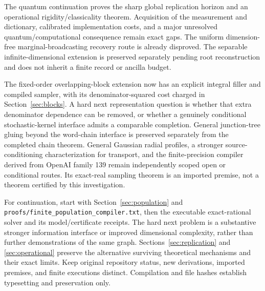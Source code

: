 \documentclass[11pt]{article}
\begin{document}
The quantum continuation proves the sharp global replication horizon and an operational rigidity/classicality theorem. Acquisition of the measurement and dictionary, calibrated implementation costs, and a major unresolved quantum/computational consequence remain exact gaps. The uniform dimension-free marginal-broadcasting recovery route is already disproved. The separable infinite-dimensional extension is preserved separately pending root reconstruction and does not inherit a finite record or ancilla budget.

The fixed-order overlapping-block extension now has an explicit integral filler and compiled sampler, with its denominator-squared cost charged in Section~\ref{sec:blocks}. A hard next representation question is whether that extra denominator dependence can be removed, or whether a genuinely conditional stochastic-kernel interface admits a comparable completion. General junction-tree gluing beyond the word-chain interface is preserved separately from the completed chain theorem. General Gaussian radial profiles, a stronger source-conditioning characterization for transport, and the finite-precision compiler derived from OpenAI family 139 remain independently scoped open or conditional routes. Its exact-real sampling theorem is an imported premise, not a theorem certified by this investigation.

For continuation, start with Section~\ref{sec:population} and \texttt{proofs/finite\_population\_compiler.txt}, then the executable exact-rational solver and its model/certificate receipts. The hard next problem is a substantive stronger information interface or improved dimensional complexity, rather than further demonstrations of the same graph. Sections~\ref{sec:replication} and \ref{sec:operational} preserve the alternative surviving theoretical mechanisms and their exact limits. Keep original repository status, new derivations, imported premises, and finite executions distinct. Compilation and file hashes establish typesetting and preservation only.
\end{document}
